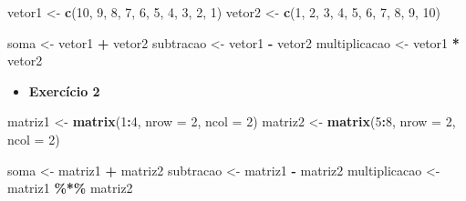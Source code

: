 \documentclass[
]{book}
\newenvironment{Shaded}{\begin{snugshade}}{\end{snugshade}}
\newcommand{\AttributeTok}[1]{\textcolor[rgb]{0.13,0.29,0.53}{#1}}
\newcommand{\DecValTok}[1]{\textcolor[rgb]{0.00,0.00,0.81}{#1}}
\newcommand{\FunctionTok}[1]{\textcolor[rgb]{0.13,0.29,0.53}{\textbf{#1}}}
\newcommand{\NormalTok}[1]{#1}
\newcommand{\OtherTok}[1]{\textcolor[rgb]{0.56,0.35,0.01}{#1}}
\newcommand{\SpecialCharTok}[1]{\textcolor[rgb]{0.81,0.36,0.00}{\textbf{#1}}}
\providecommand{\tightlist}{%
  \setlength{\itemsep}{0pt}\setlength{\parskip}{0pt}}
\begin{document}
\begin{Shaded}
\begin{Highlighting}[]
\NormalTok{vetor1 }\OtherTok{\textless{}{-}} \FunctionTok{c}\NormalTok{(}\DecValTok{10}\NormalTok{, }\DecValTok{9}\NormalTok{, }\DecValTok{8}\NormalTok{, }\DecValTok{7}\NormalTok{, }\DecValTok{6}\NormalTok{, }\DecValTok{5}\NormalTok{, }\DecValTok{4}\NormalTok{, }\DecValTok{3}\NormalTok{, }\DecValTok{2}\NormalTok{, }\DecValTok{1}\NormalTok{)}
\NormalTok{vetor2 }\OtherTok{\textless{}{-}} \FunctionTok{c}\NormalTok{(}\DecValTok{1}\NormalTok{, }\DecValTok{2}\NormalTok{, }\DecValTok{3}\NormalTok{, }\DecValTok{4}\NormalTok{, }\DecValTok{5}\NormalTok{, }\DecValTok{6}\NormalTok{, }\DecValTok{7}\NormalTok{, }\DecValTok{8}\NormalTok{, }\DecValTok{9}\NormalTok{, }\DecValTok{10}\NormalTok{)}

\NormalTok{soma }\OtherTok{\textless{}{-}}\NormalTok{ vetor1 }\SpecialCharTok{+}\NormalTok{ vetor2}
\NormalTok{subtracao }\OtherTok{\textless{}{-}}\NormalTok{ vetor1 }\SpecialCharTok{{-}}\NormalTok{ vetor2}
\NormalTok{multiplicacao }\OtherTok{\textless{}{-}}\NormalTok{ vetor1 }\SpecialCharTok{*}\NormalTok{ vetor2}
\end{Highlighting}
\end{Shaded}

\begin{itemize}
\tightlist
\item
  \textbf{Exercício 2}
\end{itemize}

\begin{Shaded}
\begin{Highlighting}[]
\NormalTok{matriz1 }\OtherTok{\textless{}{-}} \FunctionTok{matrix}\NormalTok{(}\DecValTok{1}\SpecialCharTok{:}\DecValTok{4}\NormalTok{, }\AttributeTok{nrow =} \DecValTok{2}\NormalTok{, }\AttributeTok{ncol =} \DecValTok{2}\NormalTok{)}
\NormalTok{matriz2 }\OtherTok{\textless{}{-}} \FunctionTok{matrix}\NormalTok{(}\DecValTok{5}\SpecialCharTok{:}\DecValTok{8}\NormalTok{, }\AttributeTok{nrow =} \DecValTok{2}\NormalTok{, }\AttributeTok{ncol =} \DecValTok{2}\NormalTok{)}

\NormalTok{soma }\OtherTok{\textless{}{-}}\NormalTok{ matriz1 }\SpecialCharTok{+}\NormalTok{ matriz2}
\NormalTok{subtracao }\OtherTok{\textless{}{-}}\NormalTok{ matriz1 }\SpecialCharTok{{-}}\NormalTok{ matriz2}
\NormalTok{multiplicacao }\OtherTok{\textless{}{-}}\NormalTok{ matriz1 }\SpecialCharTok{\%*\%}\NormalTok{ matriz2}
\end{Highlighting}
\end{Shaded}
\end{document}
